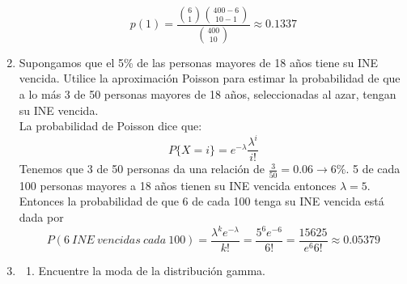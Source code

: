 \documentclass[11pt,a4paper]{report}
\begin{document}
\begin{enumerate}
{            $$p(1)=\frac{\binom{6}{1}\binom{400-6}{10-1}}{\binom{400}{10}}\approx 0.1337 $$
		}

		\item{
			Supongamos que el 5\% de las personas mayores de 18 años tiene su
            INE vencida. Utilice la aproximación Poisson para estimar la
            probabilidad de que a lo más 3 de 50 personas mayores de 18 años,
            seleccionadas al azar, tengan su INE vencida.\\
            La probabilidad de Poisson dice que:
            $$P\lbrace X=i \rbrace = e^{-\lambda} \frac{\lambda^{i}}{i!}$$
            Tenemos que 3 de 50 personas da una relación de $\frac{3}{50}=0.06 \rightarrow 6\%$. 5 de cada 100 personas mayores a 18 años tienen su INE vencida entonces $\lambda=5$. Entonces la probabilidad de que 6 de cada 100 tenga su INE vencida está dada por
            $$P(6 \ INE \ vencidas \ cada \ 100)=\frac{\lambda^{k}e^{-\lambda}}{k!}=\frac{5^{6}e^{-6}}{6!}=\frac{15625}{e^{6} 6!}\approx 0.05379$$
		}

		\item{
			\begin{enumerate}
				\item {
					Encuentre la moda de la distribución gamma.
					
}
\end{enumerate}}
\end{enumerate}
\end{document}
